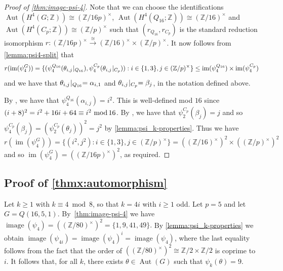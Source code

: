 \documentclass[11pt,leqno,a4paper]{amsart}
\newcommand{\Z}{\mathbb{Z}}
\renewcommand{\mod}{\,\,\text{\normalfont mod}\,}
\DeclareMathOperator{\Aut}{Aut}
\DeclareMathOperator{\image}{image}
\DeclareMathOperator{\IM}{im}
\theoremstyle{definition}
\theoremstyle{remark}
\theoremstyle{custom}
\begin{document}
\begin{proof}[Proof of \cref{thm:image-psi-4}]
Note that we can choose the identifications $\Aut(H^4(G;\Z)) \cong (\Z/16p)^\times$, $\Aut(H^4(Q_{16};\Z)) \cong (\Z/16)^\times$ and $\Aut(H^4(C_p;\Z))\cong (\Z/p)^\times$ such that $(r_{Q_{16}},r_{C_p})$ is the standard reduction isomorphism $r : (\Z/16p)^\times \xrightarrow[]{\cong} (\Z/16)^\times  \times (\Z/p)^\times$.
It now follows from \cref{lemma:psi4-split} that 
\[ r(\IM(\psi_4^G)) = \{ (\psi_4^{Q_{16}}(\theta_{i,j}\hspace{-.75mm}\mid_{Q_{16}}), \psi_4^{C_p}(\theta_{i,j}\hspace{-.75mm}\mid_{C_p})) : i \in \{1,3\}, j \in (\Z/p)^\times\} \le \IM(\psi_4^{Q_{16}}) \times \IM(\psi_4^{C_p}) \]
and we have that $\theta_{i,j}\hspace{-.75mm}\mid_{Q_{16}} = \alpha_{i,1}$ and $\theta_{i,j}\hspace{-.75mm}\mid_{C_p} = \beta_j$, in the notation defined above.

By \cite[Proposition 8.2]{Sw60-II}, we have that $\psi_4^{Q_{16}}(\alpha_{i,j}) = i^2$. This is well-defined mod $16$ since $(i+8)^2 = i^2 + 16i+64 \equiv i^2 \mod 16$. 
By \cite[Proposition 8.1]{Sw60-II}, we have that
$\psi_2^{C_p}(\beta_j) = j$  and so $\psi_4^{C_p}(\beta_j) = (\psi_2^{C_p}(\theta_j))^2 = j^2$ by \cref{lemma:psi_k-properties}.
Thus we have 
\[ r(\IM(\psi_4^G)) = \{(i^2,j^2) : i \in \{1,3\}, j \in (\Z/p)^\times\} =  ((\Z/16)^\times)^2 \times ((\Z/p)^\times)^2 \]
and so $\IM(\psi_4^G) = ((\Z/16p)^\times)^2$, as required.
\end{proof}

\subsection{Proof of \cref{thmx:automorphism}} \label{ss:Aut-proof}

Let $k \geq 1$ with $k \equiv 4 \bmod 8$, so that $k = 4i$ with $i \ge 1$ odd. 
Let $p = 5$ and let $G = Q(16,5,1)$.  By~\cref{thm:image-psi-4} we have
$\image(\psi_4) = ((\Z/80)^\times)^2 = \{1, 9, 41, 49\}.$
By \cref{lemma:psi_k-properties} we obtain
$\image(\psi_{4i}) = \image(\psi_4)^i = \image(\psi_4)$,
where the last equality follows from the fact that the order of $((\Z/80)^\times)^2 \cong \Z/2 \times \Z/2$ is coprime to $i$. It follows that, for all $k$, there exists $\theta \in \Aut(G)$ such that $\psi_k(\theta)=9$.
\end{document}
